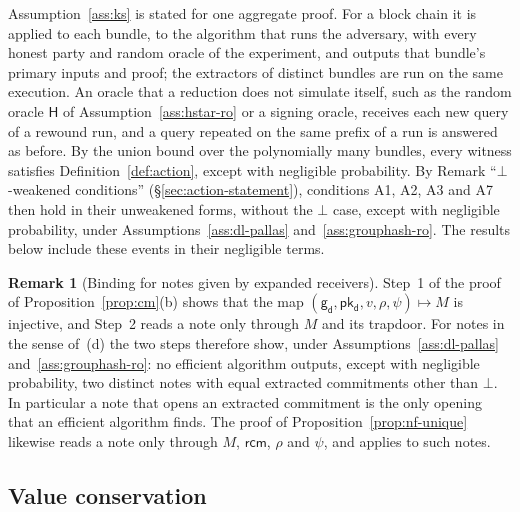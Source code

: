 \documentclass[11pt,a4paper]{article}
\theoremstyle{definition}
\newtheorem{remark}[theorem]{Remark}
\newcommand{\pkd}{\ensuremath{\mathsf{pk_d}}}
\newcommand{\gd}{\ensuremath{\mathsf{g_d}}}
\newcommand{\rcm}{\ensuremath{\mathsf{rcm}}}
\begin{document}
Assumption~\ref{ass:ks} is stated for one aggregate proof. For a block
chain it is applied to each bundle, to the algorithm that runs the
adversary, with every honest party and random oracle of the experiment, and
outputs that bundle's primary inputs and proof; the extractors of distinct
bundles are run on the same execution. An oracle that a reduction does not
simulate itself, such as the random oracle $\mathsf{H}$ of
Assumption~\ref{ass:hstar-ro} or a signing oracle, receives each new query
of a rewound run, and a query repeated on the same prefix of a run is
answered as before. By the union bound over the polynomially many bundles,
every witness satisfies Definition~\ref{def:action}, except with negligible
probability. By Remark ``$\bot$-weakened conditions''
(\S\ref{sec:action-statement}), conditions A1, A2, A3 and A7 then hold in
their unweakened forms, without the $\bot$ case, except with negligible
probability, under Assumptions~\ref{ass:dl-pallas} and~\ref{ass:grouphash-ro}.
The results below include these events in their negligible terms.

\begin{remark}[Binding for notes given by expanded receivers]
Step~1 of the proof of Proposition~\ref{prop:cm}(b) shows that the map
$(\gd, \pkd, v, \rho, \psi) \mapsto M$ is injective, and Step~2 reads a note
only through $M$ and its trapdoor. For notes in the sense of~(d) the two
steps therefore show, under Assumptions~\ref{ass:dl-pallas}
and~\ref{ass:grouphash-ro}: no efficient algorithm outputs, except with
negligible probability, two distinct notes with equal extracted commitments
other than $\bot$. In particular a note that opens an extracted commitment
is the only opening that an efficient algorithm finds. The proof of
Proposition~\ref{prop:nf-unique} likewise reads a note only through $M$,
$\rcm$, $\rho$ and $\psi$, and applies to such notes.
\end{remark}

\subsection{Value conservation}\label{sec:security-balance}
\end{document}
